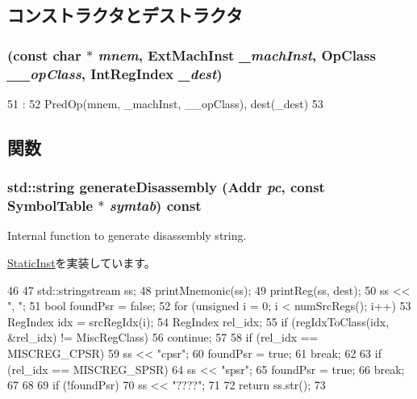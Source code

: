 \subsection{コンストラクタとデストラクタ}
\hypertarget{classMrsOp_a613f0eff39635ef68d126aa7b9656c76}{
\subsubsection[{MrsOp}]{ (const char $\ast$ {\em mnem}, \/  {\bf ExtMachInst} {\em \_\-machInst}, \/  OpClass {\em \_\-\_\-opClass}, \/  {\bf IntRegIndex} {\em \_\-dest})}}
\label{classMrsOp_a613f0eff39635ef68d126aa7b9656c76}



\begin{DoxyCode}
51                                :
52         PredOp(mnem, _machInst, __opClass), dest(_dest)
53     {}

\end{DoxyCode}


\subsection{関数}
\hypertarget{classMrsOp_a95d323a22a5f07e14d6b4c9385a91896}{
\subsubsection[{generateDisassembly}]{\setlength{\rightskip}{0pt plus 5cm}std::string generateDisassembly ({\bf Addr} {\em pc}, \/  const SymbolTable $\ast$ {\em symtab}) const}}
\label{classMrsOp_a95d323a22a5f07e14d6b4c9385a91896}
Internal function to generate disassembly string. 

\hyperlink{classStaticInst_ab4a569d2623620c04f8a52bbd91d63b9}{StaticInst}を実装しています。


\begin{DoxyCode}
46 {
47     std::stringstream ss;
48     printMnemonic(ss);
49     printReg(ss, dest);
50     ss << ", ";
51     bool foundPsr = false;
52     for (unsigned i = 0; i < numSrcRegs(); i++) {
53         RegIndex idx = srcRegIdx(i);
54         RegIndex rel_idx;
55         if (regIdxToClass(idx, &rel_idx) != MiscRegClass) {
56             continue;
57         }
58         if (rel_idx == MISCREG_CPSR) {
59             ss << "cpsr";
60             foundPsr = true;
61             break;
62         }
63         if (rel_idx == MISCREG_SPSR) {
64             ss << "spsr";
65             foundPsr = true;
66             break;
67         }
68     }
69     if (!foundPsr) {
70         ss << "????";
71     }
72     return ss.str();
73 }
\end{DoxyCode}


